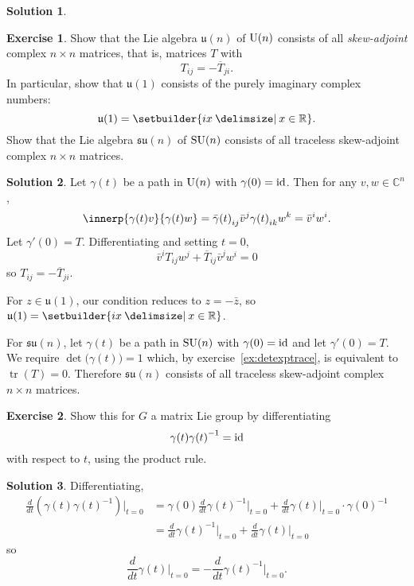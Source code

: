\documentclass[11pt, a4paper]{report}
\theoremstyle{definition}
\newtheorem{ex}{Exercise}[part]
\newtheorem{sol}{Solution}[part]
\newcommand*{\U}{\ensuremath\text{U}}
\newcommand*{\SU}{\ensuremath\text{SU}}
\DeclareMathOperator{\tr}{tr}
\newcommand*{\id}{\ensuremath\mathop{}\mathopen{}\mathrm{id}}
\begin{document}
\begin{sol}
\end{sol}

\begin{ex}

Show that the Lie algebra $\mathfrak{u}(n)$ of $\U(n)$ consists of all \emph{skew-adjoint} complex $n \times n$ matrices, that is, matrices $T$ with
\[
    T_{ij} = -\overline{T}_{ji}.
\]
In particular, show that $\mathfrak{u}(1)$ consists of the purely imaginary complex numbers:
\[
    \mathfrak{u}(1) = \setbuilder{ix \given x \in \mathbb{R}}.
\]
Show that the Lie algebra $\mathfrak{su}(n)$ of $\SU(n)$ consists of all traceless skew-adjoint complex $n \times n$ matrices.

\end{ex}

\begin{sol}

Let $\gamma(t)$ be a path in $\U(n)$ with $\gamma(0) = \id$.
Then for any $v, w \in \mathbb{C}^n$,
\[
    \innerp{\gamma(t) v}{\gamma(t) w}
        = {\bar{\gamma}(t)}_{ij}\bar{v}^j {\gamma(t)}_{ik} w^k = \bar{v}^i w^i.
\]
Let $\gamma'(0) = T$.
Differentiating and setting $t = 0$,
\[
    \bar{v}^i T_{ij} w^j + {\overline{T}}_{ij}\bar{v}^j w^i = 0
\]
so $T_{ij} = -\overline{T}_{ji}$.

For $z \in \mathfrak{u}(1)$, our condition reduces to $z = -\bar{z}$, so $\mathfrak{u}(1) = \setbuilder{ix \given x \in \mathbb{R}}$.

For $\mathfrak{su}(n)$, let $\gamma(t)$ be a path in $\SU(n)$ with $\gamma(0) = \id$ and let $\gamma'(0) = T$.
We require $\det\bigl(\gamma(t)\bigr) = 1$ which, by exercise~\ref{ex:detexptrace}, is equivalent to $\tr(T) = 0$.
Therefore $\mathfrak{su}(n)$ consists of all traceless skew-adjoint complex $n \times n$ matrices.

\end{sol}

\begin{ex}

Show this for $G$ a matrix Lie group by differentiating
\[
    \gamma(t) {\gamma(t)}^{-1} = \id
\]
with respect to $t$, using the product rule.

\end{ex}

\begin{sol}

Differentiating,
\begin{align*}
    \frac{d}{dt} \left(\gamma(t) {\gamma(t)}^{-1} \right) \Big|_{t = 0} \!
        &= \gamma(0) \frac{d}{dt} {\gamma(t)}^{-1} \Big|_{t = 0}
            + \frac{d}{dt} \gamma(t) \Big|_{t = 0} \cdot {\gamma(0)}^{-1} \\
        &= \frac{d}{dt} {\gamma(t)}^{-1} \Big|_{t = 0}
            + \frac{d}{dt} \gamma(t) \Big|_{t = 0}
\end{align*}
so
\[
    \frac{d}{dt} \gamma(t) \Big|_{t = 0} \!
        = -\frac{d}{dt} {\gamma(t)}^{-1} \Big|_{t = 0}.
\]

\end{sol}
\end{document}
